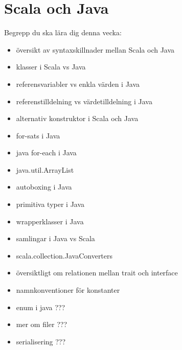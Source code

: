 \chapter{Scala och Java}\label{chapter:W11}
Begrepp du ska lära dig denna vecka:
\begin{itemize}[noitemsep,label={$\square$},leftmargin=*]
\item översikt av syntaxskillnader mellan Scala och Java
\item klasser i Scala vs Java
\item referensvariabler vs enkla värden i Java
\item referenstilldelning vs värdetilldelning i Java
\item alternativ konstruktor i Scala och Java
\item for-sats i Java
\item java for-each i Java
\item java.util.ArrayList
\item autoboxing i Java
\item primitiva typer i Java
\item wrapperklasser i Java
\item samlingar i Java vs Scala
\item scala.collection.JavaConverters
\item översiktligt om relationen mellan trait och interface
\item namnkonventioner för konstanter
\item enum i java ???
\item mer om filer ???
\item serialisering ???\end{itemize}
